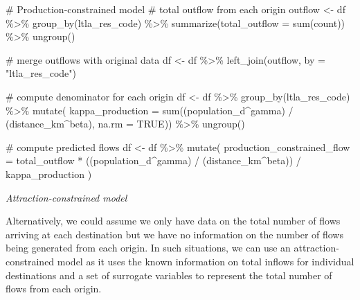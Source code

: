 \documentclass[
  a4paper, 
  twoside,
  final
]{article}
\newenvironment{Shaded}{\begin{snugshade}}{\end{snugshade}}
\newcommand{\AttributeTok}[1]{\textcolor[rgb]{0.40,0.45,0.13}{#1}}
\newcommand{\CommentTok}[1]{\textcolor[rgb]{0.37,0.37,0.37}{#1}}
\newcommand{\ConstantTok}[1]{\textcolor[rgb]{0.56,0.35,0.01}{#1}}
\newcommand{\FunctionTok}[1]{\textcolor[rgb]{0.28,0.35,0.67}{#1}}
\newcommand{\NormalTok}[1]{\textcolor[rgb]{0.00,0.23,0.31}{#1}}
\newcommand{\OtherTok}[1]{\textcolor[rgb]{0.00,0.23,0.31}{#1}}
\newcommand{\SpecialCharTok}[1]{\textcolor[rgb]{0.37,0.37,0.37}{#1}}
\newcommand{\StringTok}[1]{\textcolor[rgb]{0.13,0.47,0.30}{#1}}
\newcounter{code}
\begin{document}
\begin{Shaded}
\begin{Highlighting}[]
\CommentTok{\# Production{-}constrained model}
\CommentTok{\# total outflow from each origin}
\NormalTok{outflow }\OtherTok{\textless{}{-}}\NormalTok{ df }\SpecialCharTok{\%\textgreater{}\%}
  \FunctionTok{group\_by}\NormalTok{(ltla\_res\_code) }\SpecialCharTok{\%\textgreater{}\%}
  \FunctionTok{summarize}\NormalTok{(}\AttributeTok{total\_outflow =} \FunctionTok{sum}\NormalTok{(count)) }\SpecialCharTok{\%\textgreater{}\%} 
  \FunctionTok{ungroup}\NormalTok{()}

\CommentTok{\# merge outflows with original data}
\NormalTok{df }\OtherTok{\textless{}{-}}\NormalTok{ df }\SpecialCharTok{\%\textgreater{}\%}
  \FunctionTok{left\_join}\NormalTok{(outflow, }\AttributeTok{by =} \StringTok{"ltla\_res\_code"}\NormalTok{)}

\CommentTok{\# compute denominator for each origin}
\NormalTok{df }\OtherTok{\textless{}{-}}\NormalTok{ df }\SpecialCharTok{\%\textgreater{}\%}
  \FunctionTok{group\_by}\NormalTok{(ltla\_res\_code) }\SpecialCharTok{\%\textgreater{}\%}
  \FunctionTok{mutate}\NormalTok{(}
    \AttributeTok{kappa\_production =} 
      \FunctionTok{sum}\NormalTok{((population\_d}\SpecialCharTok{\^{}}\NormalTok{gamma) }\SpecialCharTok{/}\NormalTok{ (distance\_km}\SpecialCharTok{\^{}}\NormalTok{beta), }
                           \AttributeTok{na.rm =} \ConstantTok{TRUE}\NormalTok{)) }\SpecialCharTok{\%\textgreater{}\%}
  \FunctionTok{ungroup}\NormalTok{()}

\CommentTok{\# compute predicted flows}
\NormalTok{df }\OtherTok{\textless{}{-}}\NormalTok{ df }\SpecialCharTok{\%\textgreater{}\%} \FunctionTok{mutate}\NormalTok{(}
  \AttributeTok{production\_constrained\_flow =} 
\NormalTok{    total\_outflow }\SpecialCharTok{*}\NormalTok{ ((population\_d}\SpecialCharTok{\^{}}\NormalTok{gamma) }\SpecialCharTok{/}\NormalTok{ (distance\_km}\SpecialCharTok{\^{}}\NormalTok{beta)) }\SpecialCharTok{/} 
\NormalTok{    kappa\_production}
\NormalTok{  )}
\end{Highlighting}
\end{Shaded}

\emph{Attraction-constrained model}

Alternatively, we could assume we only have data on the total number of
flows arriving at each destination but we have no information on the
number of flows being generated from each origin. In such situations, we
can use an attraction-constrained model as it uses the known information
on total inflows for individual destinations and a set of surrogate
variables to represent the total number of flows from each origin.
\end{document}
